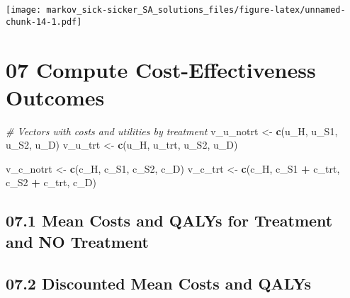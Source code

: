 \documentclass[
]{article}
\newenvironment{Shaded}{\begin{snugshade}}{\end{snugshade}}
\newcommand{\CommentTok}[1]{\textcolor[rgb]{0.56,0.35,0.01}{\textit{#1}}}
\newcommand{\KeywordTok}[1]{\textcolor[rgb]{0.13,0.29,0.53}{\textbf{#1}}}
\newcommand{\NormalTok}[1]{#1}
\newcommand{\OperatorTok}[1]{\textcolor[rgb]{0.81,0.36,0.00}{\textbf{#1}}}
\newcommand{\StringTok}[1]{\textcolor[rgb]{0.31,0.60,0.02}{#1}}
\begin{document}
\texttt{[image: markov\_sick-sicker\_SA\_solutions\_files/figure-latex/unnamed-chunk-14-1.pdf]}

\hypertarget{compute-cost-effectiveness-outcomes}{%
\section{07 Compute Cost-Effectiveness
Outcomes}\label{compute-cost-effectiveness-outcomes}}

\begin{Shaded}
\begin{Highlighting}[]
\CommentTok{# Vectors with costs and utilities by treatment}
\NormalTok{v_u_notrt   <-}\StringTok{ }\KeywordTok{c}\NormalTok{(u_H, u_S1,  u_S2, u_D)}
\NormalTok{v_u_trt     <-}\StringTok{ }\KeywordTok{c}\NormalTok{(u_H, u_trt, u_S2, u_D)}

\NormalTok{v_c_notrt   <-}\StringTok{ }\KeywordTok{c}\NormalTok{(c_H, c_S1, c_S2, c_D)}
\NormalTok{v_c_trt     <-}\StringTok{ }\KeywordTok{c}\NormalTok{(c_H, c_S1 }\OperatorTok{+}\StringTok{ }\NormalTok{c_trt, c_S2 }\OperatorTok{+}\StringTok{ }\NormalTok{c_trt, c_D)}
\end{Highlighting}
\end{Shaded}

\hypertarget{mean-costs-and-qalys-for-treatment-and-no-treatment}{%
\subsection{07.1 Mean Costs and QALYs for Treatment and NO
Treatment}\label{mean-costs-and-qalys-for-treatment-and-no-treatment}}

\begin{Shaded}
\end{Shaded}

\hypertarget{discounted-mean-costs-and-qalys}{%
\subsection{07.2 Discounted Mean Costs and
QALYs}\label{discounted-mean-costs-and-qalys}}
\end{document}
